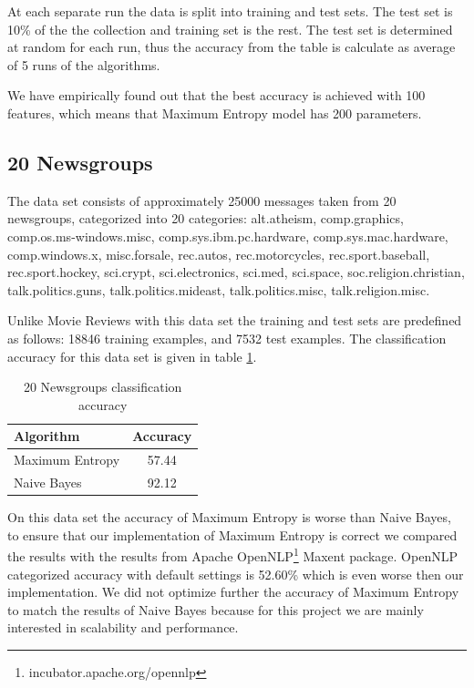 \documentclass{report}
\begin{document}
At each separate run the data is split into training and test sets. The test set is 10\% of the the collection and training set is the rest. The test set is determined at random for each run, thus the accuracy from the table is calculate as average of 5 runs of the algorithms.

We have empirically found out that the best accuracy is achieved with 100 features, which means that Maximum Entropy model has 200 parameters.

\subsection{20 Newsgroups}

The data set consists of approximately 25000 messages taken from 20 newsgroups, categorized into 20 categories: alt.atheism, comp.graphics, comp.os.ms-windows.misc,     comp.sys.ibm.pc.hardware, comp.sys.mac.hardware, comp.windows.x, misc.forsale,  rec.autos, rec.motorcycles, rec.sport.baseball, rec.sport.hockey, sci.crypt, sci.electronics,     sci.med, sci.space, soc.religion.christian, talk.politics.guns, talk.politics.mideast,     talk.politics.misc, talk.religion.misc.

Unlike Movie Reviews with this data set the training and test sets are predefined as follows: 18846 training examples, and 7532 test examples. The classification accuracy for this data set is given in table \ref{table:20nprecision}. 

\begin{table}[ht]
\centering
\begin{tabular}{ l c }
    \hline\hline
    Algorithm & Accuracy \\ [0.2ex]
    \hline
    Maximum Entropy &  57.44 \\
    Naive Bayes & 92.12  \\
    \hline
  \end{tabular}
\label{table:20nprecision}
\caption{20 Newsgroups classification accuracy}
\end{table}

On this data set the accuracy of Maximum Entropy is worse than Naive Bayes, to ensure that our implementation of Maximum Entropy is correct we compared the results with the results from Apache OpenNLP\footnote{incubator.apache.org/opennlp} Maxent package. OpenNLP categorized accuracy with default settings is 52.60\% which is even worse then our implementation. We did not optimize further the accuracy of Maximum Entropy to match the results of Naive Bayes because for this project we are mainly interested in scalability and performance.
\end{document}
